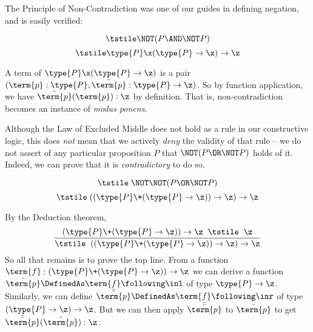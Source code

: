 The Principle of Non-Contradiction was one of our guides in defining negation, and is easily verified:

\begin{Theorem}
\label{thm:Non-Contradiction}
\[
\tstile
\NOT (P \AND \NOT P)
\]
\[
\tstile
\type{P}\x(\type{P}\to\z) \to \z
\]
\end{Theorem}
\begin{Proof}
A term of $\type{P} \x (\type{P}\to\z)$ is a pair 
$(\term{p}:\type{P}, 
\bar{\term{p}}:\type{P} \to \z)$.
So by function application, we have
$\bar{\term{p}}(\term{p}): \z$ by definition.  That is, non-contradiction becomes an instance of \emph{modus ponens}.
\end{Proof}


Although the Law of Excluded Middle does not hold as a rule in our constructive logic, this does \emph{not} mean that we actively \emph{deny} the validity of that rule -- we do not assert of any particular proposition $P$ that $\NOT(P \OR \NOT P)$ holds of it.  Indeed, we can prove that it is \emph{contradictory} to do so.
\begin{Theorem}
\label{thm:NOT-NOT-LEM}
\[
\tstile \; 
\NOT \NOT (P \OR \NOT P)
\]
\[
\tstile \; 
((\type{P} \+ (\type{P} \to \z)) \to \z) \to \z
\]
\end{Theorem}
\begin{Proof}
By the Deduction theorem, 
\[
\frac{
(\type{P} \+ (\type{P} \to \z)) \to \z
\;\;\tstile \;\;
 \z
}{
\tstile \;\;
((\type{P} \+ (\type{P} \to \z)) \to \z) \to \z
}
\]
So all that remains is to prove the top line.
From a function
$\term{f}:(\type{P} \+ (\type{P} \to \z)) \to \z$ we can derive a function 
$\bar{\term{p}} \DefinedAs
\term{f} \following \inl$ of type $\type{P} \to \z$.  
Similarly, we can define 
$\bar{\bar{\term{p}}} \DefinedAs
\term{f} \following \inr$ of type $(\type{P} \to \z) \to \z$.  But we can then apply $\bar{\bar{\term{p}}}$ to 
$\bar{\term{p}}$ to get 
$\bar{\bar{\term{p}}}(\bar{\term{p}}):\z$.






\end{Proof}







